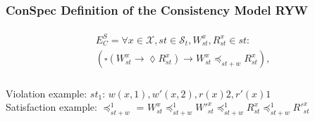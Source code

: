 \documentclass{beamer}
\begin{document}
\begin{frame}
\frametitle{ConSpec Definition of the Consistency Model RYW}
	\begin{align}\label{eqn:RYW}
\begin{split}
E^S_C =  \forall x \in \mathcal{X}, \mathit{st} \in  \mathcal{S}_t, W_\mathit{st}^x, R_\mathit{st}^x \in \mathit{st}:
\\ \left( \square \left( W_\mathit{st}^x \rightarrow \lozenge R_\mathit{st}^x \right)
\rightarrow  W_\mathit{st}^x  \preccurlyeq_{\mathit{st}+w} R_\mathit{st}^x \right),
\end{split}
\end{align}\\

Violation example:
$\mathit{st}_1$: $w(x,1), w'(x,2), r(x){2}, r'(x){1}$\\

Satisfaction example:
$\preccurlyeq_{\mathit{st}+w}^1$ = $W^x_{\mathit{st}} \preccurlyeq_{\mathit{st}+w}^1 W'^x_{\mathit{st}} \preccurlyeq_{\mathit{st}+w}^1 R^x_{\mathit{st}}
\preccurlyeq_{\mathit{st}+w}^1 R'^x_{\mathit{st}}$
\end{frame}
\end{document}
